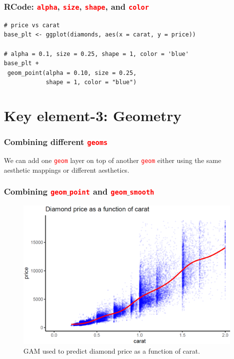 \documentclass{beamer}
\begin{document}
\begin{frame}[fragile]\frametitle{RCode: \textcolor{red}{\texttt{alpha}}, \textcolor{red}{\texttt{size}}, \textcolor{red}{\texttt{shape}}, and \textcolor{red}{\texttt{color}}}
\begin{lstlisting}
# price vs carat
base_plt <- ggplot(diamonds, aes(x = carat, y = price))

# alpha = 0.1, size = 0.25, shape = 1, color = 'blue'
base_plt +
 geom_point(alpha = 0.10, size = 0.25,
            shape = 1, color = "blue")
\end{lstlisting}
\end{frame}

\section{Key element-3: Geometry}
\begin{frame}\frametitle{Combining different \textcolor{red}{\texttt{geoms}}}
\Large
We can add one \textcolor{red}{\texttt{geom}} layer on top of another \textcolor{red}{\texttt{geom}} either using the same aesthetic mappings or different aesthetics.
\end{frame}

\begin{frame}\frametitle{Combining \textcolor{red}{\texttt{geom}}$\_$\textcolor{red}{\texttt{point}} and \textcolor{red}{\texttt{geom}}$\_$\textcolor{red}{\texttt{smooth}}}
\begin{figure}
\includegraphics[width=0.99\linewidth]{PlotsLec2/GeomPointSmooth2}
\caption{\small{GAM used to predict diamond price as a function of carat.}}
\end{figure}
\end{frame}
\end{document}

